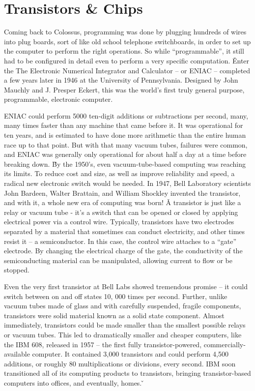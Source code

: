 \section{Transistors \& Chips}

Coming back to Colossus, programming was done by plugging hundreds of wires into plug boards, sort of like old school
telephone switchboards, in order to set up the computer to perform the right operations. So while ``programmable'',
it still had to be configured in detail even to perform a very specific computation. \v

Enter the The Electronic Numerical Integrator and Calculator – or ENIAC – completed a few years later in 1946 at the
University of Pennsylvania. Designed by John Mauchly and J. Presper Eckert, this was the world's first truly general
purpose, programmable, electronic computer.


ENIAC could perform 5000 ten-digit additions or subtractions per second, many, many times faster than any machine
that came before it. It was operational for ten years, and is estimated to have done more arithmetic than the entire
human race up to that point. But with that many vacuum tubes, failures were common, and ENIAC was generally only
operational for about half a day at a time before breaking down. \v

By the 1950's, even vacuum-tube-based computing was reaching its limits. To reduce cost and size, as well as improve
reliability and speed, a radical new electronic switch would be needed. In 1947, Bell Laboratory scientists John
Bardeen, Walter Brattain, and William Shockley invented the transistor, and with it, a whole new era of computing was
born! \v

A transistor is just like a relay or vacuum tube - it's a switch that can be opened or closed by applying electrical
power via a control wire. Typically, transistors have two electrodes separated by a material that sometimes can
conduct electricity, and other times resist it – a semiconductor. In this case, the control wire attaches to a
``gate'' electrode. By changing the electrical charge of the gate, the conductivity of the semiconducting material
can be manipulated, allowing current to flow or be stopped.


Even the very first transistor at Bell Labs showed tremendous promise – it could switch between on and off states 10,
000 times per second. Further, unlike vacuum tubes made of glass and with carefully suspended, fragile components,
transistors were solid material known as a solid state component. Almost immediately, transistors could be made
smaller than the smallest possible relays or vacuum tubes. This led to dramatically smaller and cheaper computers,
like the IBM 608, released in 1957 – the first fully transistor-powered, commercially-available computer. It
contained 3,000 transistors and could perform 4,500 additions, or roughly 80 multiplications or divisions, every
second. IBM soon transitioned all of its computing products to transistors, bringing transistor-based computers into
offices, and eventually, homes. \v

